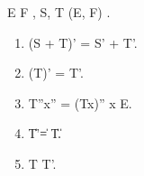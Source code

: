  E  F  ,  S, T \in {}(E, F)  \lambda \in {}. 

\begin{enumerate}
\item[(i)] (S + T)' = S' + T'.
\item[(ii)] (\lambda T)' = \lambda T'.
\item[(iii)] T''x'' = (Tx)''  x \in E.
\item[(iv)] \|T'\| = \|T\|.
\item[(v)]  T  T'.
\end{enumerate}
